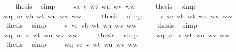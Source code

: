 \begin{isabellebody}
\ \ \isamarkupfalse%
\ \isamarkupfalse%
\ {\isacharquery}{\kern0pt}thesis\ \isamarkupfalse%
\ simp\isanewline
{}\isamarkupfalse%
\isanewline
\ \ \isamarkupfalse%
\ {\isacharparenleft}{\kern0pt}{}{}\ va\ v\ wt\ wu\ wv\ ww{\isacharparenright}{\kern0pt}\isanewline
\ \ \isamarkupfalse%
\ \isamarkupfalse%
\ {\isacharquery}{\kern0pt}thesis\ \isamarkupfalse%
\ simp\isanewline
{}\isamarkupfalse%
\isanewline
\ \ \isamarkupfalse%
\ {\isacharparenleft}{\kern0pt}{}{}\ wq\ vc\ vb\ wt\ wu\ wv\ ww{\isacharparenright}{\kern0pt}\isanewline
\ \ \isamarkupfalse%
\ \isamarkupfalse%
\ {\isacharquery}{\kern0pt}thesis\ \isamarkupfalse%
\ simp\isanewline
{}\isamarkupfalse%
\isanewline
\ \ \isamarkupfalse%
\ {\isacharparenleft}{\kern0pt}{}{}\ v\ vc\ vb\ wt\ wu\ wv\ ww{\isacharparenright}{\kern0pt}\isanewline
\ \ \isamarkupfalse%
\ \isamarkupfalse%
\ {\isacharquery}{\kern0pt}thesis\ \isamarkupfalse%
\ simp\isanewline
{}\isamarkupfalse%
\isanewline
\ \ \isamarkupfalse%
\ {\isacharparenleft}{\kern0pt}{}{}\ v\ vc\ vb\ wt\ wu\ wv\ ww{\isacharparenright}{\kern0pt}\isanewline
\ \ \isamarkupfalse%
\ \isamarkupfalse%
\ {\isacharquery}{\kern0pt}thesis\ \isamarkupfalse%
\ simp\isanewline
{}\isamarkupfalse%
\isanewline
\ \ \isamarkupfalse%
\ {\isacharparenleft}{\kern0pt}{}{}\ wq\ vc\ v\ wt\ wu\ wv\ ww{\isacharparenright}{\kern0pt}\isanewline
\ \ \isamarkupfalse%
\ \isamarkupfalse%
\ {\isacharquery}{\kern0pt}thesis\ \isamarkupfalse%
\ simp\isanewline
{}\isamarkupfalse%
\isanewline
\ \ \isamarkupfalse%
\ {\isacharparenleft}{\kern0pt}{}{}\ wq\ vc\ v\ wt\ wu\ wv\ ww{\isacharparenright}{\kern0pt}\isanewline
\ \ \isamarkupfalse%
\ \isamarkupfalse%
\ {\isacharquery}{\kern0pt}thesis\ \isamarkupfalse%
\ simp\isanewline
{}\isamarkupfalse%
\isanewline
\ \ \isamarkupfalse%
\ {\isacharparenleft}{\kern0pt}{}{}\ wq\ vc\ v\ wt\ wu\ wv\ ww{\isacharparenright}{\kern0pt}\isanewline
\ \ \isamarkupfalse%

\end{isabellebody}
